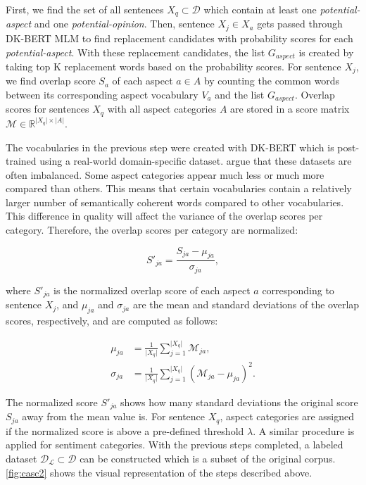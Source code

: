 \documentclass[american, oneside]{ecsgdp}
\begin{document}
First, we find the set of all sentences $X_q \subset \mathcal{D}$ which contain at least one \textit{potential-aspect} and one \textit{potential-opinion}. Then, sentence $X_j \in X_a$ gets passed through DK-BERT MLM to find replacement candidates with probability scores for each \textit{potential-aspect}. With these replacement candidates, the list $G_{aspect}$ is created by taking top K replacement words based on the probability scores. For sentence $X_j$, we find overlap score $S_a$ of each aspect $a \in A$ by counting the common words between its corresponding aspect vocabulary $V_a$ and the list $G_{aspect}$. Overlap scores for sentences $X_q$ with all aspect categories $A$ are stored in a score matrix $\mathcal{M} \in \mathbb{R}^{\lvert X_q \rvert \times \lvert A \rvert}$.

The vocabularies in the previous step were created with DK-BERT which is post-trained using a real-world domain-specific dataset. \textcite{Kumar2021CASC} argue that these datasets are often imbalanced. Some aspect categories appear much less or much more compared than others. This means that certain vocabularies contain a relatively larger number of semantically coherent words compared to other vocabularies. This difference in quality will affect the variance of the overlap scores per category. Therefore, the overlap scores per category are normalized:

\begin{equation}
    S'_{ja} = \frac{S_{ja} - \mu_{ja}}{\sigma_{ja}},
\end{equation}

\noindent where $S'_{ja}$ is the normalized overlap score of each aspect $a$ corresponding to sentence $X_j$, and $\mu_{ja}$ and $\sigma_{ja}$ are the mean and standard deviations of the overlap scores, respectively, and are computed as follows:

\begin{align}
    \mu_{ja}    & = \frac{1}{\lvert X_q \rvert} \sum_{j=1}^{\lvert X_q \rvert} \mathcal{M}_{ja}, \\
    \sigma_{ja} & = \frac{1}{\lvert X_q \rvert} \sum_{j=1}^{\lvert X_q \rvert} \left ( \mathcal{M}_{ja} - \mu_{ja} \right )^2.
\end{align}

The normalized score $S'_{ja}$ shows how many standard deviations the original score $S_{ja}$ away from the mean value is. For sentence $X_q$, aspect categories are assigned if the normalized score is above a pre-defined threshold $\lambda$. A similar procedure is applied for sentiment categories. With the previous steps completed, a labeled dataset $\mathcal{D}_\mathcal{L} \subset \mathcal{D}$ can be constructed which is a subset of the original corpus. \cref{fig:casc2} shows the visual representation of the steps described above.
\end{document}
